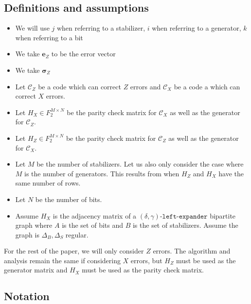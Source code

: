 \newcommand{\vecError}{{\boldsymbol{e}_Z}}
\newcommand{\vecSigma}{{\boldsymbol{\sigma}_Z}}
\newcommand{\matrixGenerator}{{H_X}}
\newcommand{\matrixParity}{H_Z}
\newcommand{\codeZ}{\mathcal{C}_Z}
\newcommand{\codeX}{\mathcal{C}_X}
\newcommand{\leftExpander}{(\delta, \gamma)\texttt{-left-expander}}
\newcommand{\NStablizer}{M}
\newcommand{\NBits}{N}
\newcommand{\MatrixField}{F_2^{\NStablizer \times \NBits}}
\newcommand{\DegBit}{{\Delta_{B}}}
\newcommand{\DegStab}{{\Delta_{S}}}

\subsection*{Definitions and assumptions}

\begin{itemize}
	\item We will use $j$ when referring to a stabilizer, $i$ when referring to a generator, $k$ when referring to a bit
	\item We take $\vecError$ to be the error vector
	\item We take $\vecSigma$
	\item Let $\codeZ$ be a code which can correct $Z$ errors and $\codeX$ be a code a which can correct $X$ errors.
	\item Let $H_X \in \MatrixField$ be the parity check matrix for $\codeX$ as well as the generator for $\codeZ$. 
	\item Let $H_Z \in \MatrixField$ be the parity check matrix for $\codeZ$ as well as the generator for $\codeX$.
	\item Let $\NStablizer$ be the number of stabilizers. Let us also only consider the case where $\NStablizer$ is the number of generators.
		This results from when $H_Z$ and $H_X$ have the same number of rows.
	\item Let $\NBits$ be the number of bits.
	\item Assume $\matrixGenerator$ is the adjacency matrix of a $\leftExpander$ bipartite graph where $A$ is the set of bits
		and $B$ is the set of stabilizers. Assume the graph is $\DegBit, \DegStab$ regular.
\end{itemize}

For the rest of the paper, we will only consider $Z$ errors. The algorithm and analysis remain the same 
if considering $X$ errors, but $H_Z$ must be used as the generator matrix and $H_X$ must be used as the parity check matrix.

\subsection*{Notation}
